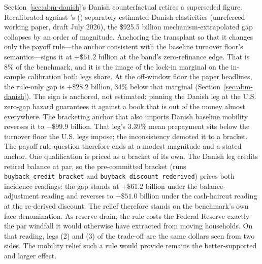 \documentclass[12pt]{article}
\newcommand{\citepos}[1]{\citeauthor{#1}'s (\citeyear{#1})}
\begin{document}
Section~\ref{sec:abm-danish}'s Danish counterfactual retires a superseded figure. Recalibrated against \citepos{berger2026} separately-estimated Danish elasticities (unrefereed working paper, draft July 2026), the \$925.5 billion mechanism-extrapolated gap collapses by an order of magnitude. Anchoring the transplant so that it changes only the payoff rule---the anchor consistent with the baseline turnover floor's semantics---signs it at $+\$61.2$ billion at the band's zero-refinance edge. That is 8\% of the benchmark, and it is the image of the lock-in marginal on the in-sample calibration both legs share. At the off-window floor the paper headlines, the rule-only gap is $+\$28.2$ billion, 34\% below that marginal (Section~\ref{sec:abm-danish}). The sign is anchored, not estimated: pinning the Danish leg at the U.S. zero-gap hazard guarantees it against a book that is out of the money almost everywhere. The bracketing anchor that also imports Danish baseline mobility reverses it to $-\$99.9$ billion. That leg's 3.39\% mean prepayment sits below the turnover floor the U.S. legs impose; the inconsistency demoted it to a bracket. The payoff-rule question therefore ends at a modest magnitude and a stated anchor. One qualification is priced as a bracket of its own. The Danish leg credits retired balance at par, so the pre-committed bracket (runs \texttt{buyback\_credit\_bracket} and \texttt{buyback\_discount\_rederived}) prices both incidence readings: the gap stands at $+\$61.2$ billion under the balance-adjustment reading and reverses to $-\$51.0$ billion under the cash-haircut reading at the re-derived discount. The relief therefore stands on the benchmark's own face denomination. As reserve drain, the rule costs the Federal Reserve exactly the par windfall it would otherwise have extracted from moving households. On that reading, legs (2) and (3) of the trade-off are the same dollars seen from two sides. The mobility relief such a rule would provide remains the better-supported and larger effect.
\end{document}
